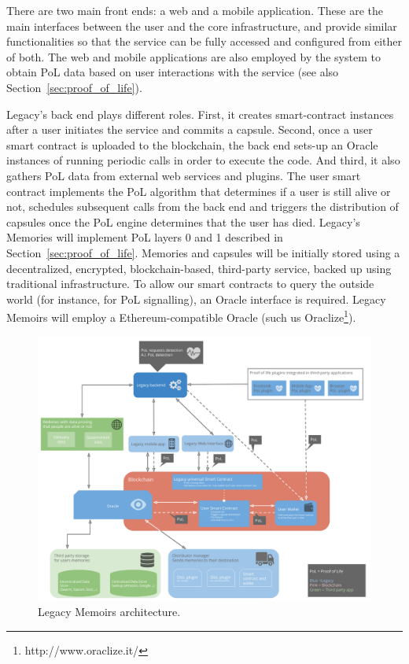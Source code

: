 There are two main front ends: a web and a mobile application. These are the main interfaces between the user and the core infrastructure, and provide similar functionalities so that the service can be fully accessed and configured from either of both.
The web and mobile applications are also employed by the system to obtain PoL data based on user interactions with the service (see also Section~\ref{sec:proof_of_life}).

Legacy’s back end plays different roles. First, it creates smart-contract instances after a user initiates the service and commits a capsule. Second, once a user smart contract is uploaded to the blockchain, the back end sets-up an Oracle instances of running periodic calls in order to execute the code. And third, it also gathers PoL data from external web services and plugins. The user smart contract implements the PoL algorithm that determines if a user is still alive or not, schedules subsequent calls from the back end and triggers the distribution of capsules once the PoL engine determines that the user has died. 
Legacy's Memories will implement PoL layers 0 and 1 described in Section~\ref{sec:proof_of_life}.
Memories and capsules will be initially stored using a decentralized, encrypted, blockchain-based, third-party service, backed up using traditional infrastructure.
To allow our smart contracts to query the outside world (for instance, for PoL signalling), an Oracle interface is required. Legacy Memoirs will employ a Ethereum-compatible Oracle (such us Oraclize\footnote{http://www.oraclize.it/}).

\begin{figure}[h]
  \centering
  \includegraphics[scale=0.4]{fig/architecture_v02_hybrid}
  \caption{Legacy Memoirs architecture.}
  \label{fig:leg_v1_arch}
\end{figure} 

